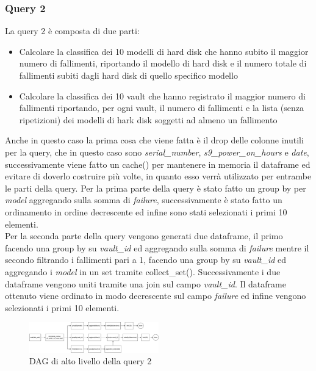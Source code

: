 \documentclass[conference]{IEEEtran}
\begin{document}
\subsubsection{Query 2}
La query 2 è composta di due parti:
\begin{itemize}
    \item Calcolare la classifica dei 10 modelli di hard disk che hanno subito il maggior numero di fallimenti, riportando il modello di hard disk e il numero totale di fallimenti subiti dagli hard disk di quello specifico modello
    \item Calcolare la classifica dei 10 vault che hanno registrato il maggior numero di
    fallimenti riportando, per ogni vault, il numero di fallimenti e la lista (senza ripetizioni) dei modelli di
    hark disk soggetti ad almeno un fallimento
\end{itemize}
Anche in questo caso la prima cosa che viene fatta è il drop delle colonne inutili per la query, che in questo caso sono \textit{serial\_number}, \textit{s9\_power\_on\_hours} e \textit{date}, successivamente viene fatto un cache() per mantenere in memoria il dataframe ed evitare di doverlo costruire più volte, in quanto esso verrà utilizzato per entrambe le parti della query.
Per la prima parte della query è stato fatto un group by per \textit{model} aggregando sulla somma di \textit{failure}, successivamente è stato fatto un ordinamento in ordine decrescente ed infine sono stati selezionati i primi 10 elementi.\\
Per la seconda parte della query vengono generati due dataframe, il primo facendo una group by su \textit{vault\_id} ed aggregando sulla somma di \textit{failure} mentre il secondo filtrando i fallimenti pari a 1, facendo una group by su \textit{vault\_id} ed aggregando i \textit{model} in un set tramite collect\_set(). Successivamente i due dataframe vengono uniti tramite una join sul campo \textit{vault\_id}. Il dataframe ottenuto viene ordinato in modo decrescente sul campo \textit{failure} ed infine vengono selezionati i primi 10 elementi.
\begin{figure}[H]
    \centerline{\includegraphics[width=0.5\textwidth]{res/query2_dag.png}}
    \caption{DAG di alto livello della query 2}
    \label{fig:dag_query2}
\end{figure}
\end{document}
